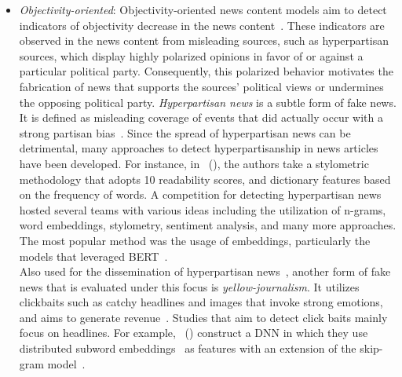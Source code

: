 \begin{description}
\begin{itemize}
        \item \emph{Objectivity-oriented}: Objectivity-oriented news content models aim to detect indicators of objectivity decrease in the news content~\parencite{FakeNewsDetectionOnSocialMediaADataMiningPerspective_Shu}. These indicators are observed in the news content from misleading sources, such as hyperpartisan sources, which display highly polarized opinions in favor of or against a particular political party. Consequently, this polarized behavior motivates the fabrication of news that supports the sources’ political views or undermines the opposing political party. \emph{Hyperpartisan news} is a subtle form of fake news. It is defined as misleading coverage of events that did actually occur with a strong partisan bias~\parencite{FightingMisinformationOnSocialMedia_Pennycook}. Since the spread of hyperpartisan news can be detrimental, many approaches to detect hyperpartisanship in news articles have been developed. For instance, in~\citeauthor{AStylometricInquiry_Potthast} (\citeyear{AStylometricInquiry_Potthast}), the authors take a stylometric methodology that adopts 10 readability scores, and dictionary features based on the frequency of words. A competition for detecting hyperpartisan news~\parencite{SemEvalHyperpartisanNewsDetection_Kiesel} hosted several teams with various ideas including the utilization of n-grams, word embeddings, stylometry, sentiment analysis, and many more approaches. The most popular method was the usage of embeddings, particularly the models that leveraged BERT~\parencite{BERT_Devlin}.\\ Also used for the dissemination of hyperpartisan news~\parencite{SemEvalHyperpartisanNewsDetection_Kiesel}, another form of fake news that is evaluated under this focus is \emph{yellow-journalism}. It utilizes clickbaits such as catchy headlines and images that invoke strong emotions, and aims to generate revenue~\parencite{ClickbaitDetectionUsingDL_Agrawal, ClickbaitAndTabloidStrategies_Dolors}. Studies that aim to detect click baits mainly focus on headlines. For example,~\citeauthor{DivingDeepIntoClickbaits_Rony} (\citeyear{DivingDeepIntoClickbaits_Rony})  construct a DNN in which they use distributed subword embeddings~\parencite{EnrichingWordVectorsWithSubwordInfo_Bojanowski, BagOfTricksForTextClassificatoin_Joulin} as features with an extension of the skip-gram model~\parencite{DistributedRepresentationsOfWords_Mikolov}.
    \end{itemize}

\end{description}
